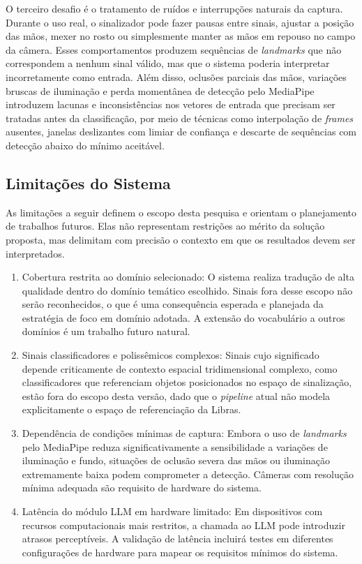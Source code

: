 \documentclass[
    12pt,                %
    openright,           %
    oneside,             %
    a4paper,             %
    english,             %
    brazil               %
]{abntex2}
\begin{document}
O terceiro desafio é o tratamento de ruídos e interrupções naturais da captura. Durante o uso real, o sinalizador pode fazer pausas entre sinais, ajustar a posição das mãos, mexer no rosto ou simplesmente manter as mãos em repouso no campo da câmera. Esses comportamentos produzem sequências de \textit{landmarks} que não correspondem a nenhum sinal válido, mas que o sistema poderia interpretar incorretamente como entrada. Além disso, oclusões parciais das mãos, variações bruscas de iluminação e perda momentânea de detecção pelo MediaPipe introduzem lacunas e inconsistências nos vetores de entrada que precisam ser tratadas antes da classificação, por meio de técnicas como interpolação de \textit{frames} ausentes, janelas deslizantes com limiar de confiança e descarte de sequências com detecção abaixo do mínimo aceitável.

\subsection{Limitações do Sistema}

As limitações a seguir definem o escopo desta pesquisa e orientam o planejamento de trabalhos futuros. Elas não representam restrições ao mérito da solução proposta, mas delimitam com precisão o contexto em que os resultados devem ser interpretados.

\begin{enumerate}
    \item Cobertura restrita ao domínio selecionado: O sistema realiza tradução de alta qualidade dentro do domínio temático escolhido. Sinais fora desse escopo não serão reconhecidos, o que é uma consequência esperada e planejada da estratégia de foco em domínio adotada. A extensão do vocabulário a outros domínios é um trabalho futuro natural.
    \item Sinais classificadores e polissêmicos complexos: Sinais cujo significado depende criticamente de contexto espacial tridimensional complexo, como classificadores que referenciam objetos posicionados no espaço de sinalização, estão fora do escopo desta versão, dado que o \textit{pipeline} atual não modela explicitamente o espaço de referenciação da Libras.
    \item Dependência de condições mínimas de captura: Embora o uso de \textit{landmarks} pelo MediaPipe reduza significativamente a sensibilidade a variações de iluminação e fundo, situações de oclusão severa das mãos ou iluminação extremamente baixa podem comprometer a detecção. Câmeras com resolução mínima adequada são requisito de hardware do sistema.
    \item Latência do módulo LLM em hardware limitado: Em dispositivos com recursos computacionais mais restritos, a chamada ao LLM pode introduzir atrasos perceptíveis. A validação de latência incluirá testes em diferentes configurações de hardware para mapear os requisitos mínimos do sistema.
\end{enumerate}
\end{document}
